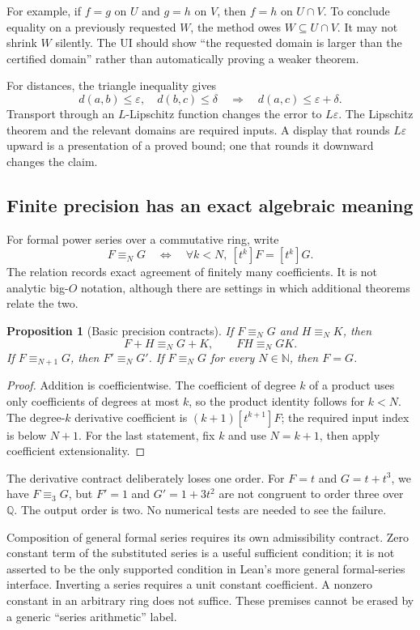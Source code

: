 \documentclass[11pt,a4paper]{article}
\newcommand{\N}{\mathbb N}\newcommand{\Z}{\mathbb Z}
\newcommand{\Q}{\mathbb Q}\newcommand{\R}{\mathbb R}
\newtheorem{proposition}{Proposition}[section]
\theoremstyle{remark}\newtheorem{example}[proposition]{Example}
\begin{document}
For example, if $f=g$ on $U$ and $g=h$ on $V$, then $f=h$ on $U\cap V$. To conclude equality on a previously requested $W$, the method owes $W\subseteq U\cap V$. It may not shrink $W$ silently. The UI should show ``the requested domain is larger than the certified domain'' rather than automatically proving a weaker theorem.

For distances, the triangle inequality gives
\[
 d(a,b)\leq\varepsilon,\quad d(b,c)\leq\delta
 \quad\Longrightarrow\quad d(a,c)\leq\varepsilon+\delta.
\]
Transport through an $L$-Lipschitz function changes the error to $L\varepsilon$. The Lipschitz theorem and the relevant domains are required inputs. A display that rounds $L\varepsilon$ upward is a presentation of a proved bound; one that rounds it downward changes the claim.

\subsection{Finite precision has an exact algebraic meaning}
For formal power series over a commutative ring, write
\[
 F\equiv_N G\quad\Longleftrightarrow\quad
 \forall k<N,\ [t^k]F=[t^k]G.
\]
The relation records exact agreement of finitely many coefficients. It is not analytic big-$O$ notation, although there are settings in which additional theorems relate the two.

\begin{proposition}[Basic precision contracts]\label{prop:precision}
If $F\equiv_N G$ and $H\equiv_N K$, then
\[
 F+H\equiv_N G+K,\qquad FH\equiv_N GK.
\]
If $F\equiv_{N+1}G$, then $F'\equiv_N G'$. If $F\equiv_N G$ for every $N\in\N$, then $F=G$.
\end{proposition}
\begin{proof}
Addition is coefficientwise. The coefficient of degree $k$ of a product uses only coefficients of degrees at most $k$, so the product identity follows for $k<N$. The degree-$k$ derivative coefficient is $(k+1)[t^{k+1}]F$; the required input index is below $N+1$. For the last statement, fix $k$ and use $N=k+1$, then apply coefficient extensionality.
\end{proof}
The derivative contract deliberately loses one order. For $F=t$ and $G=t+t^3$, we have $F\equiv_3G$, but $F'=1$ and $G'=1+3t^2$ are not congruent to order three over $\Q$. The output order is two. No numerical tests are needed to see the failure.

Composition of general formal series requires its own admissibility contract. Zero constant term of the substituted series is a useful sufficient condition; it is not asserted to be the only supported condition in Lean's more general formal-series interface. Inverting a series requires a unit constant coefficient. A nonzero constant in an arbitrary ring does not suffice. These premises cannot be erased by a generic ``series arithmetic'' label.
\end{document}
